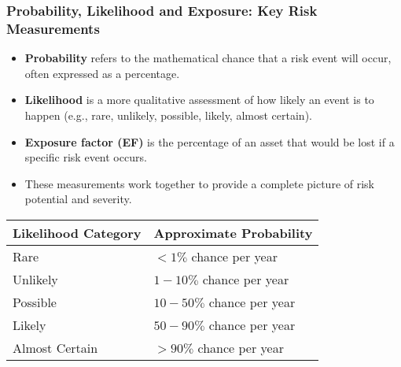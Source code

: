 \documentclass{beamer}
\begin{document}
    \begin{frame}
      \frametitle{Probability, Likelihood and Exposure: Key Risk Measurements}
      \begin{itemize}
        \item \textbf{Probability} refers to the mathematical chance that a risk event will occur, often expressed as a percentage.
        \item \textbf{Likelihood} is a more qualitative assessment of how likely an event is to happen (e.g., rare, unlikely, possible, likely, almost certain).
        \item \textbf{Exposure factor (EF)} is the percentage of an asset that would be lost if a specific risk event occurs.
        \item These measurements work together to provide a complete picture of risk potential and severity.
      \end{itemize}
      
      \begin{table}
      \centering
      \begin{tabular}{ll}
      \toprule
      \textbf{Likelihood Category} & \textbf{Approximate Probability} \\
      \midrule
      Rare & $<1\%$ chance per year \\
      Unlikely & $1-10\%$ chance per year \\
      Possible & $10-50\%$ chance per year \\
      Likely & $50-90\%$ chance per year \\
      Almost Certain & $>90\%$ chance per year \\
      \bottomrule
      \end{tabular}
      \end{table}
      \end{frame}
      
\end{document}

